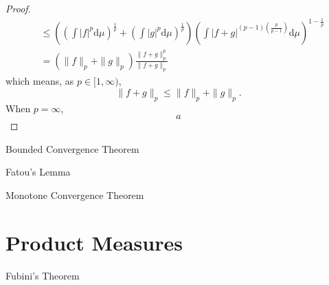 \begin{proof}
\begin{equation*}
\begin{aligned}
                            & \leq\left(\left(\int|f|^{p} \mathrm{d} \mu\right)^{\frac{1}{p}}+\left(\int|g|^{p} \mathrm{d} \mu\right)^{\frac{1}{p}}\right)\left(\int|f+g|^{(p-1)\left(\frac{p}{p-1}\right)} \mathrm{d} \mu\right)^{1-\frac{1}{p}} \\
                            & =\left(\|f\|_{p}+\|g\|_{p}\right) \frac{\|f+g\|_{p}^{p}}{\|f+g\|_{p}}
        \end{aligned}
    \end{equation*}
    which means, as $p\in[1,\infty)$,
    \begin{equation*}
        \|f+g\|_{p} \leq\|f\|_{p}+\|g\|_{p}.
    \end{equation*}
    When $p=\infty$,
    \begin{equation*}
        a
    \end{equation*}
\end{proof}

\begin{theorem}{Bounded Convergence Theorem}{}

\end{theorem}

\begin{theorem}{Fatou's Lemma}{}

\end{theorem}

\begin{theorem}{Monotone Convergence Theorem}{}

\end{theorem}

\section{Product Measures}

\begin{theorem}{Fubini's Theorem}{}

\end{theorem}